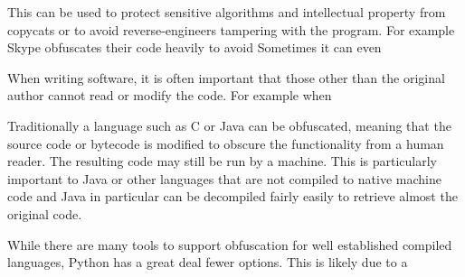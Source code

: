 \documentclass{report}
\begin{document}
This can be used to protect sensitive algorithms and intellectual
property from copycats or to avoid reverse-engineers tampering with
the program. For example Skype obfuscates their code heavily to
avoid Sometimes it can even

When writing software, it is often important that those other than
the original author cannot read or modify the code. For example
when \cite[p1]{taxobftrans}

Traditionally a language such as C or Java can be obfuscated,
meaning that the source code or bytecode is modified to obscure the
functionality from a human reader. The resulting code may still be
run by a machine. This is particularly important to Java or other
languages that are not compiled to native machine code and Java in
particular can be decompiled fairly easily to retrieve almost the
original code.

While there are many tools to support obfuscation for well
established compiled languages, Python has a great deal fewer
options. This is likely due to a
\end{document}
